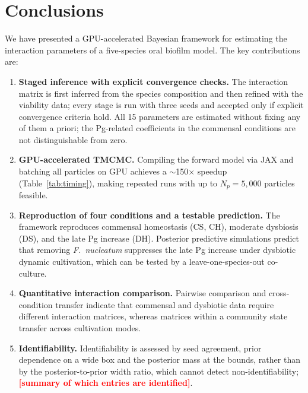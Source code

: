 \documentclass[pdflatex,sn-mathphys-ay,lineno]{sn-jnl}%
\newcommand{\TBD}[1]{\textcolor{red}{\textbf{[#1]}}}
\begin{document}
\section{Conclusions}
\label{sec:conclusions}

We have presented a GPU-accelerated Bayesian framework for estimating the interaction parameters of a five-species oral biofilm model.
The key contributions are:

\begin{enumerate}[nosep,leftmargin=*]
\item \textbf{Staged inference with explicit convergence checks.}
The interaction matrix is first inferred from the species composition and then refined with the viability data; every stage is run with three seeds and accepted only if explicit convergence criteria hold.
All 15 parameters are estimated without fixing any of them a priori; the Pg-related coefficients in the commensal conditions are not distinguishable from zero.

\item \textbf{GPU-accelerated TMCMC.}
Compiling the forward model via JAX and batching all particles on GPU achieves a $\sim$150$\times$ speedup (Table~\ref{tab:timing}), making repeated runs with up to $N_p=5{,}000$ particles feasible.

\item \textbf{Reproduction of four conditions and a testable prediction.}
The framework reproduces commensal homeostasis (CS, CH), moderate dysbiosis (DS), and the late Pg increase (DH).
Posterior predictive simulations predict that removing \textit{F.~nucleatum} suppresses the late Pg increase under dysbiotic dynamic cultivation, which can be tested by a leave-one-species-out co-culture.

\item \textbf{Quantitative interaction comparison.}
Pairwise comparison and cross-condition transfer indicate that commensal and dysbiotic data require different interaction matrices, whereas matrices within a community state transfer across cultivation modes.

\item \textbf{Identifiability.}
Identifiability is assessed by seed agreement, prior dependence on a wide box and the posterior mass at the bounds, rather than by the posterior-to-prior width ratio, which cannot detect non-identifiability; \TBD{summary of which entries are identified}.
\end{enumerate}
\end{document}
